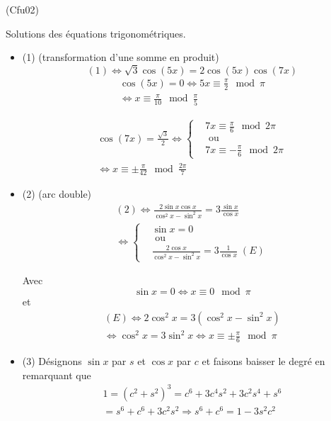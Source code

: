 \begin{tiny}(Cfu02)\end{tiny} Solutions des équations trigonométriques.
\begin{itemize}
  \item (1) (transformation d'une somme en produit)
\begin{displaymath}
 (1) \Leftrightarrow \sqrt{3}\cos(5x) = 2\cos(5x)\cos(7x) 
\end{displaymath}
\begin{multline*}
\cos(5x)=0\Leftrightarrow 5x\equiv \frac{\pi}{2}\mod \pi\\
\Leftrightarrow x\equiv \frac{\pi}{10}\mod \frac{\pi}{5}
\end{multline*}

\begin{multline*}
\cos(7x)=\frac{\sqrt{3}}{2}\Leftrightarrow
\left\lbrace 
\begin{aligned}
&7x\equiv \frac{\pi}{6}\mod 2\pi \\ &\text{ ou } \\ &7x\equiv -\frac{\pi}{6}\mod 2\pi   
\end{aligned}
\right. \\
\Leftrightarrow x\equiv \pm\frac{\pi}{42}\mod \frac{2\pi}{7}
\end{multline*}

  \item (2) (arc double)
\begin{multline*}
(2)\Leftrightarrow \frac{2\sin x \cos x}{\cos^2x - \sin^2 x}= 3\frac{\sin x}{\cos x} \\
\Leftrightarrow
\left\lbrace 
\begin{aligned}
&\sin x = 0 \\ &\text{ ou }\\
 &\frac{2\cos x}{\cos^2x - \sin^2 x}= 3\frac{1}{\cos x} \;(E)
\end{aligned}
\right. 
\end{multline*}

Avec
\begin{displaymath}
\sin x = 0 \Leftrightarrow x\equiv 0 \mod \pi  
\end{displaymath}
et
\begin{multline*}
(E) \Leftrightarrow 2\cos^2 x = 3(\cos^2x -\sin^2 x) \\
\Leftrightarrow \cos^2 x = 3\sin^2 x 
\Leftrightarrow x \equiv \pm \frac{\pi}{6} \mod \pi
\end{multline*} 

  \item (3) Désignons $\sin x$ par $s$ et $\cos x$ par $c$ et faisons baisser le degré en remarquant que
\begin{multline*}
1 =(c^2+s^2)^3 = c^6+3c^4s^2+3c^2s^4+s^6 \\
=s^6+c^6+3c^2s^2
\Rightarrow 
s^6+c^6 = 1-3s^2c^2
\end{multline*}


\end{itemize}
